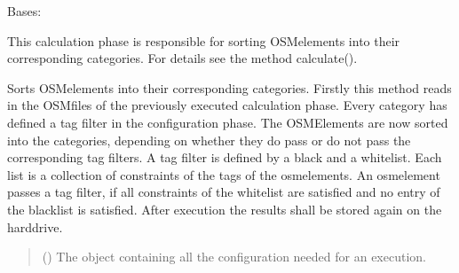 \documentclass[letterpaper,10pt,english]{sphinxmanual}
\begin{document}
\begin{fulllineitems}
\label{\detokenize{apidoc/src.osm_configurator.model.project.calculation:src.osm_configurator.model.project.calculation.tag_filter_phase.TagFilterPhase}}
\pysigstartsignatures
{}
\pysigstopsignatures
\sphinxAtStartPar
Bases: {\hyperref[\detokenize{apidoc/src.osm_configurator.model.project.calculation:src.osm_configurator.model.project.calculation.calculation_phase_interface.ICalculationPhase}]{}}

\sphinxAtStartPar
This calculation phase is responsible for sorting OSM\sphinxhyphen{}elements into their corresponding categories.
For details see the method calculate().

\begin{fulllineitems}
\label{\detokenize{apidoc/src.osm_configurator.model.project.calculation:src.osm_configurator.model.project.calculation.tag_filter_phase.TagFilterPhase.calculate}}
\pysigstartsignatures
{}
\pysigstopsignatures
\sphinxAtStartPar
Sorts OSM\sphinxhyphen{}elements into their corresponding categories.
Firstly this method reads in the OSM\sphinxhyphen{}files of the previously executed calculation phase. Every category has
defined a tag filter in the configuration phase. The OSM\sphinxhyphen{}Elements are now sorted into the categories, depending
on whether they do pass or do not pass the corresponding tag filters. A tag filter is defined by a
black\sphinxhyphen{} and a whitelist. Each list is a collection of constraints of the tags of the osm\sphinxhyphen{}elements. An
osm\sphinxhyphen{}element passes a tag filter, if all constraints of the whitelist are satisfied and no entry of the
blacklist is satisfied.
After execution the results shall be stored again on the hard\sphinxhyphen{}drive.
\begin{quote}\begin{description}
\sphinxAtStartPar
{} ({\hyperref[\detokenize{apidoc/src.osm_configurator.model.project.configuration:src.osm_configurator.model.project.configuration.configuration_manager.ConfigurationManager}]{}}) \textendash{} The object containing all the configuration needed for an execution.


\end{description}
\end{quote}
\end{fulllineitems}
\end{fulllineitems}
\end{document}
